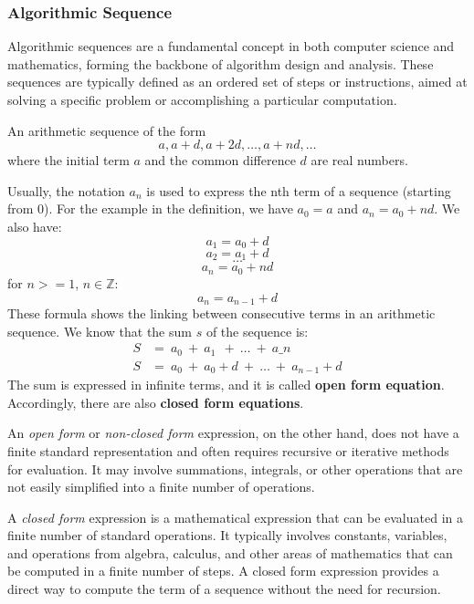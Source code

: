 \subsubsection{Algorithmic Sequence}
Algorithmic sequences are a fundamental concept in both computer science and mathematics, forming the backbone of algorithm design and analysis. These sequences are typically defined as an ordered set of steps or instructions, aimed at solving a specific problem or accomplishing a particular computation.
\begin{definition}
    An arithmetic sequence of the form
\[
a, a + d, a + 2d, \ldots, a + nd, \ldots
\]
where the initial term \( a \) and the common difference \( d \) are real numbers.
\end{definition}
Usually, the notation $a_n$ is used to express the nth term of a sequence (starting from 0). For the example in the 
definition, we have $a_0 = a$ and $a_n = a_0 + nd$. 
We also have:
$$a_1 = a_0 + d$$
$$a_2 = a_1 + d$$
$$\dots$$
$$a_n = a_0 + nd$$ 
for $n>=1$, $n\in \mathbb{Z}$:
$$a_n = a_{n-1} + d$$
These formula shows the linking between consecutive terms in an arithmetic sequence. We know that the sum
$s$ of the sequence is:
\begin{align*}
    S & =\ a_{0} \ +\ a_1\ \ +\ \dotsc \ +\ a\_n\\
    S & =\ a_{0} \ +\ a_{0} +d\ +\ \dotsc \ +\ a_{n-1} +d
    \end{align*}
The sum is expressed in infinite terms, and it is called \textbf{open form equation}. Accordingly, there are also \textbf{closed form
equations}.
\begin{definition}
    An \textit{open form} or \textit{non-closed form} expression, on the other hand, does not have a finite standard representation and often requires recursive or iterative methods for evaluation. It may involve summations, integrals, or other operations that are not easily simplified into a finite number of operations.
\end{definition}
\begin{definition}
    A \textit{closed form} expression is a mathematical expression that can be evaluated in a finite number of standard operations. It typically involves constants, variables, and operations from algebra, calculus, and other areas of mathematics that can be computed in a finite number of steps.
    A closed form expression provides a direct way to compute the term of a sequence without the need for recursion.
\end{definition}

